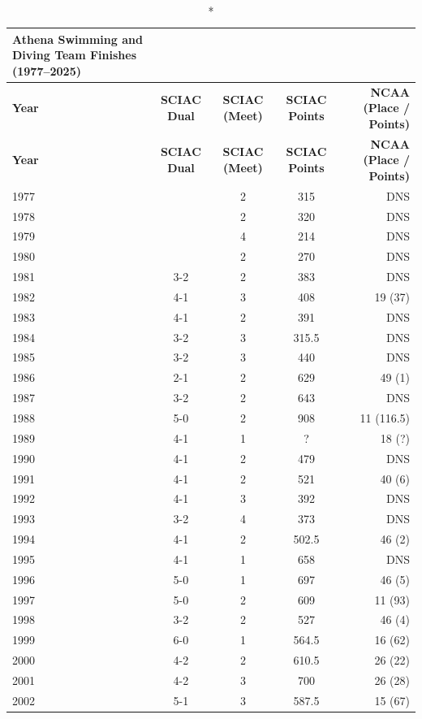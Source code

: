 \clearpage
\renewcommand{\arraystretch}{1.25}
\small
\begin{longtable}{lcccr}
\caption*{\textbf{\textcolor{teamprimary}{Athena Swimming and Diving Team Finishes (1977–2025)}}} \\
\toprule
\textbf{Year} & \textbf{SCIAC Dual} & \textbf{SCIAC (Meet)} & \textbf{SCIAC Points} & \textbf{NCAA (Place / Points)} \\
\midrule
\endfirsthead

\toprule
\rowcolor{teamprimary!25}
\textbf{Year} & \textbf{SCIAC Dual} & \textbf{SCIAC (Meet)} & \textbf{SCIAC Points} & \textbf{NCAA (Place / Points)} \\
\midrule
\endhead

\bottomrule
\endfoot

1977 &  & 2 & 315 & DNS \\
1978 &  & 2 & 320 & DNS \\
1979 &  & 4 & 214 & DNS \\
1980 &  & 2 & 270 & DNS \\
1981 & 3-2 & 2 & 383 & DNS \\
1982 & 4-1 & 3 & 408 & 19 (37) \\
1983 & 4-1 & 2 & 391 & DNS \\
1984 & 3-2 & 3 & 315.5 & DNS \\
1985 & 3-2 & 3 & 440 & DNS \\
1986 & 2-1 & 2 & 629 & 49 (1) \\
1987 & 3-2 & 2 & 643 & DNS \\
1988 & 5-0 & 2 & 908 & 11 (116.5) \\
1989 & 4-1 & 1 & ? & 18 (?) \\
1990 & 4-1 & 2 & 479 & DNS \\
1991 & 4-1 & 2 & 521 & 40 (6) \\
1992 & 4-1 & 3 & 392 & DNS \\
1993 & 3-2 & 4 & 373 & DNS \\
1994 & 4-1 & 2 & 502.5 & 46 (2) \\
1995 & 4-1 & 1 & 658 & DNS \\
1996 & 5-0 & 1 & 697 & 46 (5) \\
1997 & 5-0 & 2 & 609 & 11 (93) \\
1998 & 3-2 & 2 & 527 & 46 (4) \\
1999 & 6-0 & 1 & 564.5 & 16 (62) \\
2000 & 4-2 & 2 & 610.5 & 26 (22) \\
2001 & 4-2 & 3 & 700 & 26 (28) \\
2002 & 5-1 & 3 & 587.5 & 15 (67) \\

\end{longtable}
